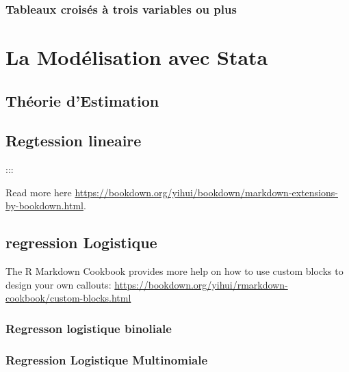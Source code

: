 \documentclass[
]{book}
\begin{document}
\hypertarget{tableaux-croisuxe9s-uxe0-trois-variables-ou-plus}{%
\subsection{Tableaux croisés à trois variables ou plus}\label{tableaux-croisuxe9s-uxe0-trois-variables-ou-plus}}

\hypertarget{la-moduxe9lisation-avec-stata}{%
\chapter{La Modélisation avec Stata}\label{la-moduxe9lisation-avec-stata}}

\hypertarget{thuxe9orie-destimation}{%
\section{Théorie d'Estimation}\label{thuxe9orie-destimation}}

\hypertarget{regtession-lineaire}{%
\section{Regtession lineaire}\label{regtession-lineaire}}

:::

Read more here \url{https://bookdown.org/yihui/bookdown/markdown-extensions-by-bookdown.html}.

\hypertarget{regression-logistique}{%
\section{regression Logistique}\label{regression-logistique}}

The R Markdown Cookbook provides more help on how to use custom blocks to design your own callouts: \url{https://bookdown.org/yihui/rmarkdown-cookbook/custom-blocks.html}

\hypertarget{regresson-logistique-binoliale}{%
\subsection{Regresson logistique binoliale}\label{regresson-logistique-binoliale}}

\hypertarget{regression-logistique-multinomiale}{%
\subsection{Regression Logistique Multinomiale}\label{regression-logistique-multinomiale}}
\end{document}
